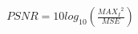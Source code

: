 \documentclass[preview]{standalone}
\begin{document}
\begin{align*}
PSNR = 10log_{10}\left(\frac{{MAX_I}^2}{MSE}\right)
\end{align*}
\end{document}
